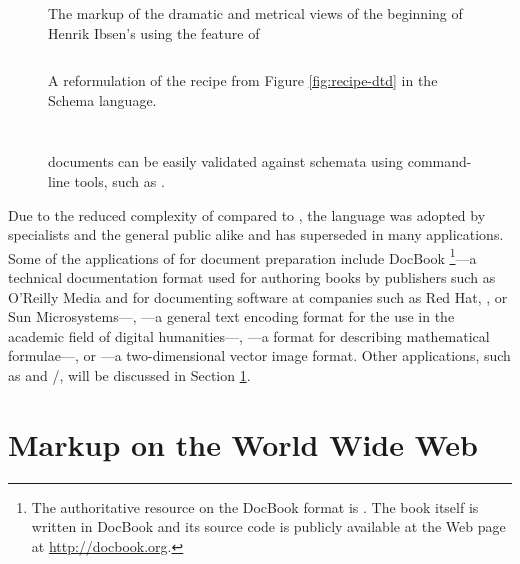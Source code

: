 \documentclass{book}
\begin{document}
\begin{figure}[hb!]
  
  \caption{The markup of the dramatic and metrical views of the beginning of
    Henrik Ibsen's  using the  feature of
    }
\end{figure}


\begin{figure}[H]
  \inputminted{xml}{examples/02/recipe.xsd}
  \caption{A reformulation of the recipe  from Figure
    \ref{fig:recipe-dtd} in the  Schema 
    language.}
  \label{fig:recipe-xsd}
  \inputminted{text}{examples/02/recipe.rnc}
  \caption{A reformulation of the recipe  from Figure
    \ref{fig:recipe-dtd} in the compact syntax of .%
    }
  \label{fig:recipe-rnc}
  \inputminted{sh}{examples/02/recipe.sh}
  \caption{ documents can be easily validated against 
    schemata using command-line tools, such as .}
\end{figure}

Due to the reduced complexity of  compared to , the
language was adopted by specialists and the general public alike and has
superseded  in many applications. Some of the applications of
 for document preparation include DocBook%
\footnote{
  The authoritative resource on the DocBook  format is
  \cite{walsh10}. The book itself is written in DocBook and its source code is
  publicly available at the Web page at \url{http://docbook.org}.
}---a technical documentation format used for authoring books by publishers such
as O'Reilly Media and for documenting software at companies such as Red Hat,
, or Sun Microsystems---, ---a general text encoding
format for the use in the academic field of digital humanities---,
---a format for describing mathematical formulae---, or
---a two-dimensional vector image format. Other 
applications, such as  and /, will
be discussed in Section \ref{sec:www-markup}.
      
\section{Markup on the World Wide Web}\label{sec:www-markup}
\end{document}
